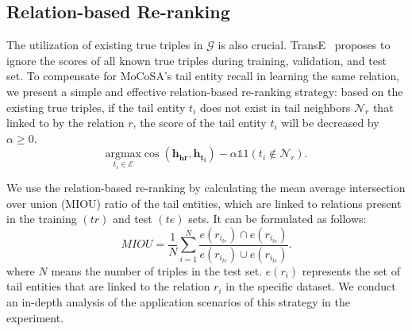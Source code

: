 \documentclass[11pt]{article}
\begin{document}
\subsection{Relation-based Re-ranking}

The utilization of existing true triples in $\mathcal{G}$ is also crucial. TransE~\cite{bordes2013translating} proposes to ignore the scores of all known true triples during training, validation, and test set. To compensate for MoCoSA's tail entity recall in learning the same relation, we present a simple and effective relation-based re-ranking strategy: based on the existing true triples, if the tail entity $t_{i}$ does not exist in tail neighbors $\mathcal{N}_{r}$ that linked to by the relation $r$, the score of the tail entity $t_{i}$ will be decreased by $\alpha \ge 0$.
\begin{equation}
\underset{t_{i} \in \mathcal{E}}{\mathrm{argmax}}\cos (\mathbf{h_{hr}}, \mathbf{h_{t_{i}}}) - \alpha\mathds{1}{1}(t_{i} \notin \mathcal{N}_{r}).
\end{equation}

We use the relation-based re-ranking by calculating the mean average intersection over union (MIOU) ratio of the tail entities, which are linked to relations present in the training $(tr)$ and test $(te)$ sets. It can be formulated as follows:
\begin{equation}
MIOU=\frac{1}{N}\sum_{i=1}^N\frac{e(r_{i_{tr}}) \cap e(r_{i_{te}})}{e(r_{i_{tr}}) \cup e(r_{i_{te}})}.
\end{equation}
where $N$ means the number of triples in the test set. $e(r_{i})$ represents the set of tail entities that are linked to the relation $r_{i}$ in the specific dataset. We conduct an in-depth analysis of the application scenarios of this strategy in the experiment.
\end{document}
